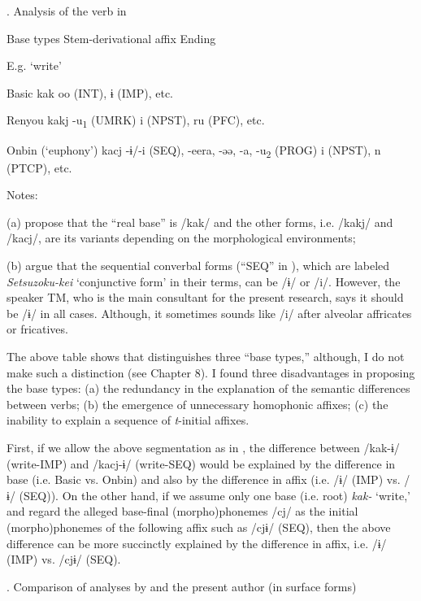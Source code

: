 \begin{styleBeschriftung}
\textmd{}\textmd{. Analysis of the verb in \citet{UchimaEtAl1976}}
\end{styleBeschriftung}

Base types    Stem-derivational affix  Ending

  E.g. ‘write’    

Basic  kak    oo (INT), ɨ (IMP), etc.

Renyou  kakj  {}-u\textsubscript{1} (UMRK)  i (NPST), ru (PFC), etc.

Onbin (‘euphony’)  kacj  {}-ɨ/-i (SEQ), -eera, -əə, -a, -u\textsubscript{2} (PROG)  i (NPST), n (PTCP), etc.

Notes:

(a) \citet[78]{UchimaEtAl1976} propose that the “real base” is /kak/ and the other forms, i.e. /kakj/ and /kacj/, are its variants depending on the morphological environments;

(b) \citet[91-92]{UchimaEtAl1976} argue that the sequential converbal forms (“SEQ” in ), which are labeled \textit{Setsuzoku-kei} ‘conjunctive form’ in their terms, can be /ɨ/ or /i/. However, the speaker TM, who is the main consultant for the present research, says it should be /ɨ/ in all cases. Although, it sometimes sounds like /i/ after alveolar affricates or fricatives.

The above table shows that \citet{UchimaEtAl1976} distinguishes three “base types,” although, I do not make such a distinction (see Chapter 8). I found three disadvantages in proposing the base types: (a) the redundancy in the explanation of the semantic differences between verbs; (b) the emergence of unnecessary homophonic affixes; (c) the inability to explain a sequence of \textit{t}{}-initial affixes.

First, if we allow the above segmentation as in , the difference between /kak-ɨ/ (write-IMP) and /kacj-ɨ/ (write-SEQ) would be explained by the difference in base (i.e. Basic vs. Onbin) and also by the difference in affix (i.e. /ɨ/ (IMP) vs. /ɨ/ (SEQ)). On the other hand, if we assume only one base (i.e. root) \textit{kak-} ‘write,’ and regard the alleged base-final (morpho)phonemes /cj/ as the initial (morpho)phonemes of the following affix such as /cjɨ/ (SEQ), then the above difference can be more succinctly explained by the difference in affix, i.e. /ɨ/ (IMP) vs. /cjɨ/ (SEQ).

\begin{styleBeschriftung}
\textmd{. Comparison of analyses by \citet{UchimaEtAl1976} and the present author (in surface forms)}
\end{styleBeschriftung}

